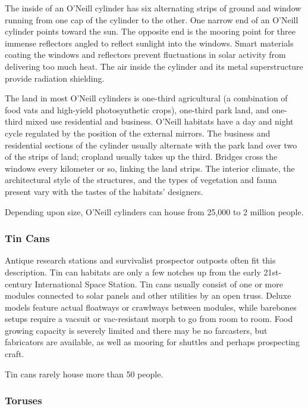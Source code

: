 The inside of an O'Neill cylinder has six alternating 
strips of ground and window running from one cap 
of the cylinder to the other. One narrow end of an 
O'Neill cylinder points toward the sun. The opposite 
end is the mooring point for three immense reflectors 
angled to reflect sunlight into the windows. Smart 
materials coating the windows and reflectors prevent 
fluctuations in solar activity from delivering too much 
heat. The air inside the cylinder and its metal superstructure
provide radiation shielding.

The land in most O'Neill cylinders is one-third 
agricultural (a combination of food vats and high-yield
photosynthetic crops), one-third park land, and
one-third mixed use residential and business. O'Neill 
habitats have a day and night cycle regulated by the 
position of the external mirrors. The business and 
residential sections of the cylinder usually alternate 
with the park land over two of the strips of land; 
cropland usually takes up the third. Bridges cross 
the windows every kilometer or so, linking the land 
strips. The interior climate, the architectural style of 
the structures, and the types of vegetation and fauna 
present vary with the tastes of the habitats' designers.

Depending upon size, O'Neill cylinders can house 
from 25,000 to 2 million people.

\subsubsection{Tin Cans}

Antique research stations and survivalist prospector 
outposts often fit this description. Tin can habitats 
are only a few notches up from the early 21st-century 
International Space Station. Tin cans usually consist 
of one or more modules connected to solar panels 
and other utilities by an open truss. Deluxe models 
feature actual floatways or crawlways between 
modules, while barebones setups require a vacsuit or 
vac-resistant morph to go from room to room. Food 
growing capacity is severely limited and there may be 
no farcasters, but fabricators are available, as well as 
mooring for shuttles and perhaps prospecting craft.

Tin cans rarely house more than 50 people.

\subsubsection{Toruses}

